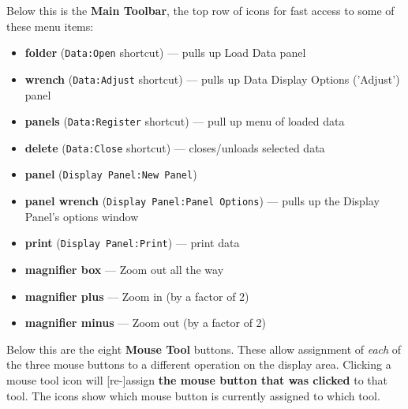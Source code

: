 Below this is the {\bf Main Toolbar}, the top row of icons for fast
access to some of these menu items:
\begin{itemize}
   \item {\bf folder} ({\tt Data:Open} shortcut) --- pulls up Load Data panel
   \item {\bf wrench} ({\tt Data:Adjust} shortcut) --- pulls up Data Display
              Options ('Adjust') panel 
   \item {\bf panels} ({\tt Data:Register} shortcut) --- pull up 
              menu of loaded data
   \item {\bf delete} ({\tt Data:Close} shortcut) --- closes/unloads 
              selected data
   \item {\bf panel} ({\tt Display Panel:New Panel})
   \item {\bf panel wrench} ({\tt Display Panel:Panel Options}) --- pulls up
              the Display Panel's options window 
   \item {\bf print} ({\tt Display Panel:Print}) --- print data
   \item {\bf magnifier box} --- Zoom out all the way
   \item {\bf magnifier plus} --- Zoom in (by a factor of 2)
   \item {\bf magnifier minus} --- Zoom out (by a factor of 2)
\end{itemize}

Below this are the eight {\bf Mouse Tool} buttons. These allow assignment of
{\it each} of the three mouse buttons to a different operation on the display
area. Clicking a mouse tool icon will [re-]assign {\bf the mouse button that
was clicked} to that tool.  The icons show which mouse button is currently
assigned to which tool.  

